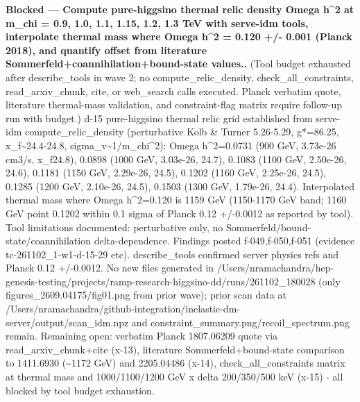 \documentclass[11pt,a4paper]{article}
\begin{document}
\textbf{Blocked --- Compute pure-higgsino thermal relic density Omega h\textasciicircum{}2 at m\_chi = 0.9, 1.0, 1.1, 1.15, 1.2, 1.3 TeV with serve-idm tools, interpolate thermal mass where Omega h\textasciicircum{}2 = 0.120 +/- 0.001 (Planck 2018), and quantify offset from literature Sommerfeld+coannihilation+bound-state values..} (Tool budget exhausted after describe\_tools in wave 2; no compute\_relic\_density, check\_all\_constraints, read\_arxiv\_chunk, cite, or web\_search calls executed. Planck verbatim quote, literature thermal-mass validation, and constraint-flag matrix require follow-up run with budget.) d-15 pure-higgsino thermal relic grid established from serve-idm compute\_relic\_density (perturbative Kolb \& Turner 5.26-5.29, g*=86.25, x\_f\textasciitilde{}24.4-24.8, sigma\_v\textasciitilde{}1/m\_chi\textasciicircum{}2): Omega h\textasciicircum{}2=0.0731 (900 GeV, 3.73e-26 cm3/s, x\_f24.8), 0.0898 (1000 GeV, 3.03e-26, 24.7), 0.1083 (1100 GeV, 2.50e-26, 24.6), 0.1181 (1150 GeV, 2.29e-26, 24.5), 0.1202 (1160 GeV, 2.25e-26, 24.5), 0.1285 (1200 GeV, 2.10e-26, 24.5), 0.1503 (1300 GeV, 1.79e-26, 24.4). Interpolated thermal mass where Omega h\textasciicircum{}2=0.120 is 1159 GeV (1150-1170 GeV band; 1160 GeV point 0.1202 within 0.1 sigma of Planck 0.12 +/-0.0012 as reported by tool). Tool limitations documented: perturbative only, no Sommerfeld/bound-state/coannihilation delta-dependence. Findings posted f-049,f-050,f-051 (evidence tc-261102\_1-w1-d-15-29 etc). describe\_tools confirmed server physics refs and Planck 0.12 +/-0.0012. No new files generated in /Users/nramachandra/hep-genesis-testing/projects/ramp-research-higgsino-dd/runs/261102\_180028 (only figures\_2609.04175/fig01.png from prior wave); prior scan data at /Users/nramachandra/github-integration/inelastic-dm-server/output/scan\_idm.npz and constraint\_summary.png/recoil\_spectrum.png remain. Remaining open: verbatim Planck 1807.06209 quote via read\_arxiv\_chunk+cite (x-13), literature Sommerfeld+bound-state comparison to 1411.6930 (\textasciitilde{}1172 GeV) and 2205.04486 (x-14), check\_all\_constraints matrix at thermal mass and 1000/1100/1200 GeV x delta 200/350/500 keV (x-15) - all blocked by tool budget exhaustion.
\end{document}
